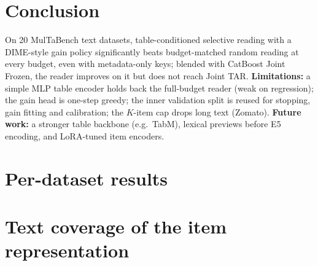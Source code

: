 \documentclass{article}
\begin{document}
\section{Conclusion}

On 20 MulTaBench text datasets, table-conditioned selective reading with a DIME-style gain policy significantly beats budget-matched random reading at every budget, even with metadata-only keys; blended with CatBoost Joint Frozen, the reader improves on it but does not reach Joint TAR.
\textbf{Limitations:} a simple MLP table encoder holds back the full-budget reader (weak on regression); the gain head is one-step greedy; the inner validation split is reused for stopping, gain fitting and calibration; the $K$-item cap drops long text (Zomato).
\textbf{Future work:} a stronger table backbone (e.g.\ TabM), lexical previews before E5 encoding, and LoRA-tuned item encoders.




\appendix
\makeatletter\setlength{\@fptop}{0pt}\setlength{\@fpsep}{12pt plus 1fil}\makeatother %
\section{Per-dataset results}\label{app:per}
\begin{table}[h]
\caption{Fold-mean scores per dataset. CB: our CatBoost (tab: tabular only).
R: reader (table only / gain policy, content keys, @25\% / read all).
Blend $\pm$ fold std.
LB: MulTaBench leaderboard for matching split seeds (row identity unverified); best TAR is the maximum over the four learners.
Bold: best of our columns.}
\centering
\scriptsize
\setlength{\tabcolsep}{3pt}
\resizebox{\linewidth}{!}{}
\end{table}

\clearpage
\section{Text coverage of the item representation}\label{app:cov}
\begin{table}[!ht]
\caption{Fold-0 test rows. Items/row: items kept after the cap $K$; rows over $K$: rows with more candidate chunks than $K$; words kept: share of the row's words inside kept items (an upper bound on what E5 sees, since a field's chunks beyond the eighth are merged into one and E5 truncates at 512 tokens).}
\centering
\scriptsize

\end{table}
\end{document}
